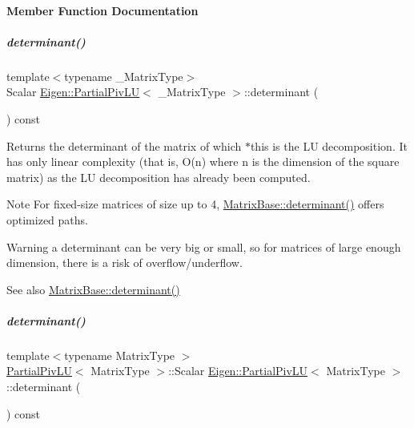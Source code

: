 \paragraph{Member Function Documentation}
\mbox{\label{group___l_u___module_a12ec1b68b38017fb5d44edcdf890c039}} 
\subparagraph{\texorpdfstring{determinant()}{determinant()}\hspace{0.1cm}{\footnotesize\ttfamily [1/2]}}
{\footnotesize\ttfamily template$<$typename \+\_\+\+Matrix\+Type$>$ \\
Scalar \hyperlink{group___l_u___module_class_eigen_1_1_partial_piv_l_u}{Eigen\+::\+Partial\+Piv\+LU}$<$ \+\_\+\+Matrix\+Type $>$\+::determinant (\begin{DoxyParamCaption}{ }\end{DoxyParamCaption}) const}

\begin{DoxyReturn}{Returns}
the determinant of the matrix of which $\ast$this is the LU decomposition. It has only linear complexity (that is, O(n) where n is the dimension of the square matrix) as the LU decomposition has already been computed.
\end{DoxyReturn}
\begin{DoxyNote}{Note}
For fixed-\/size matrices of size up to 4, \hyperlink{group___core___module_a7ad8f77004bb956b603bb43fd2e3c061}{Matrix\+Base\+::determinant()} offers optimized paths.
\end{DoxyNote}
\begin{DoxyWarning}{Warning}
a determinant can be very big or small, so for matrices of large enough dimension, there is a risk of overflow/underflow.
\end{DoxyWarning}
\begin{DoxySeeAlso}{See also}
\hyperlink{group___core___module_a7ad8f77004bb956b603bb43fd2e3c061}{Matrix\+Base\+::determinant()} 
\end{DoxySeeAlso}
\mbox{\label{group___l_u___module_a54c3d39c9b46ff485a8d2140b9b23193}} 
\subparagraph{\texorpdfstring{determinant()}{determinant()}\hspace{0.1cm}{\footnotesize\ttfamily [2/2]}}
{\footnotesize\ttfamily template$<$typename Matrix\+Type $>$ \\
\hyperlink{group___l_u___module_class_eigen_1_1_partial_piv_l_u}{Partial\+Piv\+LU}$<$ Matrix\+Type $>$\+::Scalar \hyperlink{group___l_u___module_class_eigen_1_1_partial_piv_l_u}{Eigen\+::\+Partial\+Piv\+LU}$<$ Matrix\+Type $>$\+::determinant (\begin{DoxyParamCaption}{ }\end{DoxyParamCaption}) const}


